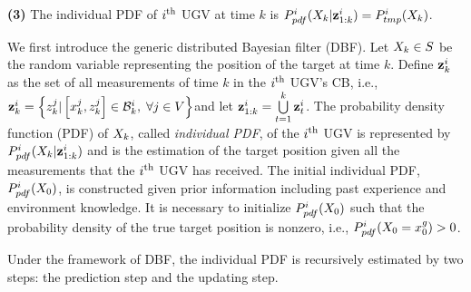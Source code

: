 \begin{algorithm}
\begin{algorithmic}
				\State\textbf{(3)} The individual PDF of $i^\text{th}$ UGV at time $k$ is
				$P^i_{pdf}(X_{k}|\mathbf{z}^{i}_{1:k})=P^i_{tmp}(X_k)$.		
			\end{algorithmic}
		\end{algorithm}

	We first introduce the generic distributed Bayesian filter (DBF).
	Let $X_k\in S$ be the random variable representing the position of the target at time $k$.
	Define $\mathbf{z}^i_k$ as the set of all measurements of time $k$ in the $i^\text{th}$ UGV's CB, i.e., \small$\mathbf{z}^i_k=\left\lbrace z^j_k| \left[x^j_k,z^j_k\right]\in \mathcal{B}^i_k,\; \forall j\in V\right\rbrace$\normalsize and let $\mathbf{z}^i_{1:k} = \bigcup\limits_{t=1}^k \mathbf{z}^i_t$.
	The probability density function (PDF) of $X_k$, called \textit{individual PDF}, of the $i^\text{th}$ UGV is represented by
	$P^i_{pdf}(X_{k}|\mathbf{z}^i_{1:k})$ and is the estimation of the target position given all the measurements that the $i^\text{th}$ UGV has received.	
	The initial individual PDF, $P^i_{pdf}(X_0)$, is constructed %
	given prior information including past experience and environment knowledge. 
	It is necessary to initialize $P^i_{pdf}(X_0)$ such that the probability density of the true target position is nonzero, i.e., $P^i_{pdf}(X_0=x^g_0)> 0$.
	
	Under the framework of DBF, the individual PDF is recursively estimated by two steps: the prediction step and the updating step. 
	
